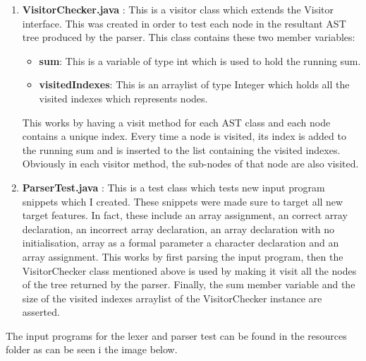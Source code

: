 \documentclass{article}
\begin{document}
				\begin{enumerate}
				\item \textbf{VisitorChecker.java} : This is a visitor class which extends the Visitor interface. This was created in order to test each node in the resultant AST tree produced by the parser. This class contains these two member variables:
				\begin{itemize}
				\item \textbf{sum}: This is a variable of type int which is used to hold the running sum.
				\item \textbf{visitedIndexes}: This is an arraylist of type Integer which holds all the visited indexes which represents nodes.
				\end{itemize}
				
				This works by having a visit method for each AST class and each node contains a unique index. Every time a node is visited, its index is added to the running sum and is inserted to the list containing the visited indexes. Obviously in each visitor method, the sub-nodes of that node are also visited.
				
				\item \textbf{ParserTest.java} : This is a test class which tests new input program snippets which I created. These snippets were made sure to target all new target features. In fact, these include an array assignment, an correct array declaration, an incorrect array declaration, an array declaration with no initialisation, array as a formal parameter a character declaration and an array assignment. This works by first parsing the input program, then the VisitorChecker class mentioned above is used by making it visit all the nodes of the tree returned by the parser. Finally, the sum member variable and the size of the visited indexes arraylist of the VisitorChecker instance are asserted.
		
				
				
				
				\end{enumerate}
				
				
				The input programs for the lexer and parser test can be found in the resources folder as can be seen i the image below.
				
				
				
				
				
		
		
		\nocite{*}

			
		
			
					
			
\end{document}

